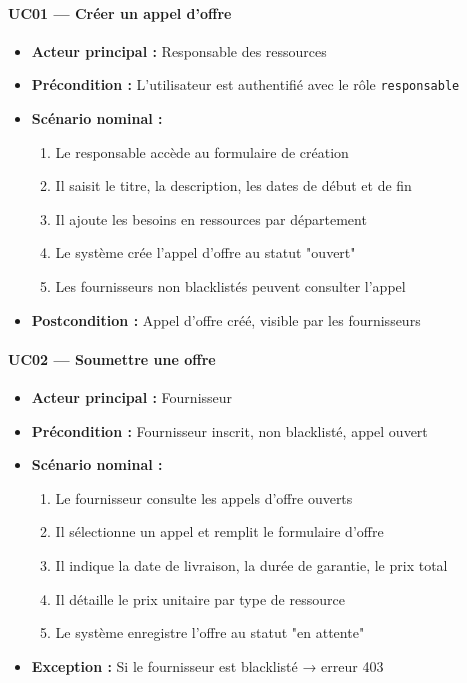 \paragraph{UC01 — Créer un appel d'offre}
\begin{itemize}
    \item \textbf{Acteur principal :} Responsable des ressources
    \item \textbf{Précondition :} L'utilisateur est authentifié avec le rôle \texttt{responsable}
    \item \textbf{Scénario nominal :}
    \begin{enumerate}
        \item Le responsable accède au formulaire de création
        \item Il saisit le titre, la description, les dates de début et de fin
        \item Il ajoute les besoins en ressources par département
        \item Le système crée l'appel d'offre au statut "ouvert"
        \item Les fournisseurs non blacklistés peuvent consulter l'appel
    \end{enumerate}
    \item \textbf{Postcondition :} Appel d'offre créé, visible par les fournisseurs
\end{itemize}

\paragraph{UC02 — Soumettre une offre}
\begin{itemize}
    \item \textbf{Acteur principal :} Fournisseur
    \item \textbf{Précondition :} Fournisseur inscrit, non blacklisté, appel ouvert
    \item \textbf{Scénario nominal :}
    \begin{enumerate}
        \item Le fournisseur consulte les appels d'offre ouverts
        \item Il sélectionne un appel et remplit le formulaire d'offre
        \item Il indique la date de livraison, la durée de garantie, le prix total
        \item Il détaille le prix unitaire par type de ressource
        \item Le système enregistre l'offre au statut "en attente"
    \end{enumerate}
    \item \textbf{Exception :} Si le fournisseur est blacklisté → erreur 403
\end{itemize}

